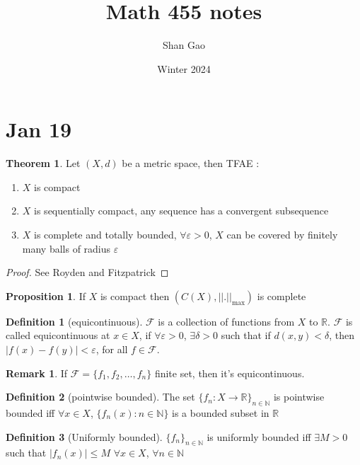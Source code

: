 \documentclass[12pt]{article}
\title{Math 455 notes}
\author{Shan Gao}
\date{Winter 2024}
\theoremstyle{definition}
\newtheorem{theorem}{Theorem}[section]
\newtheorem{proposition}{Proposition}[section]
\newtheorem{definition}{Definition}[section]
\newtheorem{remark}{Remark}[section]
\begin{document}
\maketitle

\section{Jan 19}
\begin{theorem}
	Let $(X,d)$ be a metric space, then TFAE : 
	\begin{enumerate}
		\item $X$ is compact
		\item $X$ is sequentially compact, any sequence has a convergent subsequence
		\item $X$ is complete and totally bounded, $\forall \varepsilon >0$, $X$ can be covered by finitely many balls of radius $\varepsilon$
	\end{enumerate}	
\end{theorem}
\begin{proof}
	See Royden and Fitzpatrick
\end{proof}

\begin{proposition}
	If $X$ is compact then $(C(X), ||.||_{\text{max}})$ is complete
\end{proposition}

\begin{definition}[equicontinuous]
	$\mathcal{F}$ is a collection of functions from $X$ to $\mathbb{R}$. $\mathcal{F}$ is called equicontinuous at $x \in X$, if $\forall \varepsilon > 0$, $\exists \delta > 0$ such that if $d(x,y) < \delta$, then $|f(x) - f(y)| < \varepsilon$, for all $f \in \mathcal{F}$. 
\end{definition}

\begin{remark}
	If $\mathcal{F} = \{f_1,f_2,\ldots,f_n\}$ finite set, then it's equicontinuous. 
\end{remark}
\begin{definition}[pointwise bounded]
	The set $\{f_n \colon X \to \mathbb{R}\}_{n \in \mathbb{N}}$ is pointwise bounded iff $\forall x \in X$, $\{f_n(x) \colon n \in \mathbb{N}\}$ is a bounded subset in $\mathbb{R}$ 
\end{definition}


\begin{definition}[Uniformly bounded]
	$\{f_n\}_{n \in \mathbb{N}}$ is uniformly bounded iff $\exists M > 0$ such that $|f_n(x)| \leq M$ $\forall x \in X$, $\forall n \in \mathbb{N}$ 
\end{definition}
\end{document}
